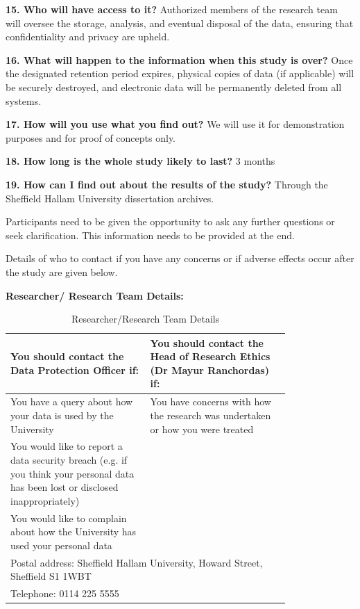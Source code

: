 \documentclass{article}
\begin{document}
\textbf{15.	Who will have access to it?} Authorized members of the research team will oversee the storage, analysis, and eventual disposal of the data, ensuring that confidentiality and privacy are upheld.

\textbf{16.	What will happen to the information when this study is over?} Once the designated retention period expires, physical copies of data (if applicable) will be securely destroyed, and electronic data will be permanently deleted from all systems.

\textbf{17.	How will you use what you find out?} We will use it for demonstration purposes and for proof of concepts only.

\textbf{18.	How long is the whole study likely to last?} 3 months

\textbf{19.	How can I find out about the results of the study?} Through the Sheffield Hallam University dissertation archives.

Participants need to be given the opportunity to ask any further questions or seek clarification. 
This information needs to be provided at the end.

Details of who to contact if you have any concerns or if adverse effects occur after the study are given below.

\textbf{Researcher/ Research Team Details:}

\begin{table}[ht]
\centering
\begin{tabular}{|p{0.4\linewidth}|p{0.4\linewidth}|}
\hline
\textbf{You should contact the Data Protection Officer if:} & \textbf{You should contact the Head of Research Ethics (Dr Mayur Ranchordas) if:} \\
\hline
You have a query about how your data is used by the University & You have concerns with how the research was undertaken or how you were treated \\
\hline
You would like to report a data security breach (e.g. if you think your personal data has been lost or disclosed inappropriately) &  \\
\hline
You would like to complain about how the University has used your personal data & \\
\hline
\multicolumn{2}{|l|}{Postal address: Sheffield Hallam University, Howard Street, Sheffield S1 1WBT} \\
\multicolumn{2}{|l|}{Telephone: 0114 225 5555} \\
\hline
\end{tabular}
\caption{Researcher/Research Team Details}
\end{table}
\end{document}
